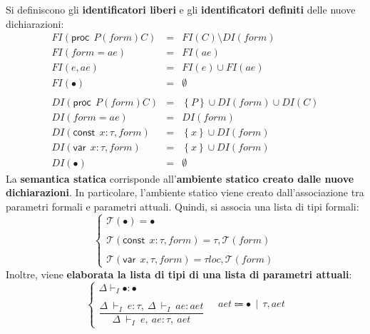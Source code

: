 \documentclass[a4paper]{article}
\begin{document}
	Si definiscono gli \textbf{identificatori liberi} e gli \textbf{identificatori definiti} delle nuove dichiarazioni:
	\begin{equation*}
		\begin{array}{lll}
			FI\left(\textsf{proc} \:\: P\left(form\right) C\right) &=& FI\left(C\right) \setminus DI\left(form\right) \\
			FI\left(form = ae\right) &=& FI\left(ae\right) \\
			FI\left(e, ae\right) &=& FI\left(e\right) \cup FI\left(ae\right) \\
			FI\left(\bullet\right) &=& \emptyset \\
			&& \\
			DI\left(\textsf{proc} \:\: P\left(form\right) C\right) &=& \left\{P\right\} \cup DI\left(form\right) \cup DI\left(C\right) \\
			DI\left(form = ae\right) &=& DI\left(form\right) \\
			DI\left(\textsf{const} \:\: x:\tau, form\right) &=& \left\{x\right\} \cup DI\left(form\right) \\
			DI\left(\textsf{var} \:\: x:\tau, form\right) &=& \left\{x\right\} \cup DI\left(form\right) \\
			DI\left(\bullet\right) &=& \emptyset
		\end{array}
	\end{equation*}
	La \textbf{semantica statica} corrisponde all'\textbf{ambiente statico creato dalle nuove dichiarazioni}. In particolare, l'ambiente statico viene creato dall'associazione tra parametri formali e parametri attuali. Quindi, si associa una lista di tipi formali:
	\begin{equation*}
		\begin{cases}
			\mathcal{T}\left(\bullet\right) = \bullet \\
			\\
			\mathcal{T}\left(\textsf{const} \:\: x:\tau, form\right) = \tau, \mathcal{T}\left(form\right) \\
			\\
			\mathcal{T}\left(\textsf{var} \:\: x,\tau, form\right) = \tau loc, \mathcal{T}\left(form\right)
		\end{cases}
	\end{equation*}
	Inoltre, viene \textbf{elaborata la lista di tipi di una lista di parametri attuali}:
	\begin{equation*}
		\begin{cases}
			\Delta\vdash_{I} \bullet : \bullet \\
			\\
			\dfrac{\Delta \: \vdash_{I} \: e : \tau, \: \Delta \: \vdash_{I} \: ae : aet}{\Delta \: \vdash_{I} \: e, \: ae : \tau, \: aet}
		\end{cases} \hspace{1em} aet \Coloneq \bullet \:\: | \:\: \tau, aet
	\end{equation*}
\end{document}
